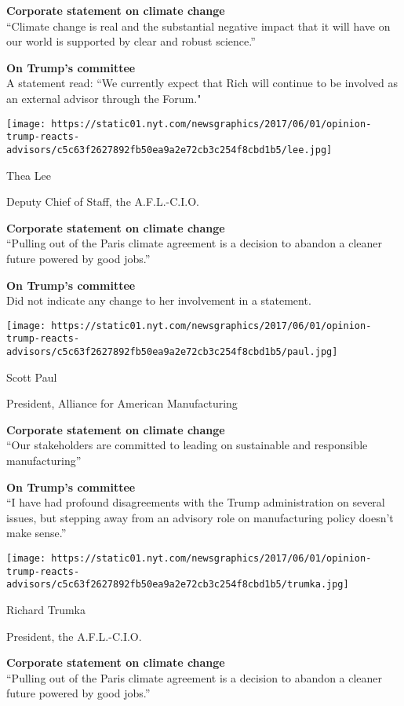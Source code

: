 \textbf{Corporate statement on climate change}\\
``Climate change is real and the substantial negative impact that it
will have on our world is supported by clear and robust science.''

\textbf{On Trump's committee}\\
A statement read: ``We currently expect that Rich will continue to be
involved as an external advisor through the Forum."

\texttt{[image: https://static01.nyt.com/newsgraphics/2017/06/01/opinion-trump-reacts-advisors/c5c63f2627892fb50ea9a2e72cb3c254f8cbd1b5/lee.jpg]}

Thea Lee

Deputy Chief of Staff, the A.F.L.-C.I.O.

\textbf{Corporate statement on climate change}\\
``Pulling out of the Paris climate agreement is a decision to abandon a
cleaner future powered by good jobs.''

\textbf{On Trump's committee}\\
Did not indicate any change to her involvement in a statement.

\texttt{[image: https://static01.nyt.com/newsgraphics/2017/06/01/opinion-trump-reacts-advisors/c5c63f2627892fb50ea9a2e72cb3c254f8cbd1b5/paul.jpg]}

Scott Paul

President, Alliance for American Manufacturing

\textbf{Corporate statement on climate change}\\
``Our stakeholders are committed to leading on sustainable and
responsible manufacturing''

\textbf{On Trump's committee}\\
``I have had profound disagreements with the Trump administration on
several issues, but stepping away from an advisory role on manufacturing
policy doesn't make sense.''

\texttt{[image: https://static01.nyt.com/newsgraphics/2017/06/01/opinion-trump-reacts-advisors/c5c63f2627892fb50ea9a2e72cb3c254f8cbd1b5/trumka.jpg]}

Richard Trumka

President, the A.F.L.-C.I.O.

\textbf{Corporate statement on climate change}\\
``Pulling out of the Paris climate agreement is a decision to abandon a
cleaner future powered by good jobs.''

